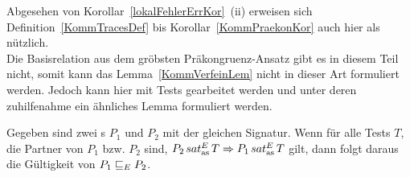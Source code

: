 Abgesehen von Korollar~\ref{lokalFehlerErrKor}~(ii) erweisen sich
Definition~\ref{KommTracesDef} bis Korollar~\ref{KommPraekonKor} auch hier als
nützlich.\\
Die Basisrelation aus dem gröbsten Präkongruenz-Ansatz gibt es in diesem Teil
nicht, somit kann das Lemma~\ref{KommVerfeinLem} nicht in dieser Art formuliert
werden. Jedoch kann hier mit Tests gearbeitet werden und unter deren
zuhilfenahme ein ähnliches Lemma formuliert werden.

\begin{Lem}
  \label{KommTestVerfeinLem}
  Gegeben sind zwei \MEIO{}s $P_1$ und $P_2$ mit der gleichen Signatur. Wenn
  für alle Tests $T$, die Partner von $P_1$ bzw. $P_2$ sind, $P_2\hspace{0.05cm}sat_\mathrm{as}^E\hspace{0.05cm} T
  \Rightarrow P_1\hspace{0.05cm}sat_\mathrm{as}^E\hspace{0.05cm} T$ gilt, dann folgt daraus die Gültigkeit von $P_1 \sqsubseteq  _E
  P_2$.
\end{Lem}
